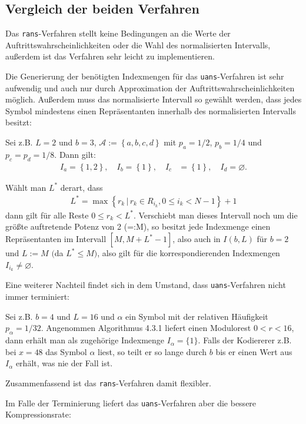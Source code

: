 \documentclass[a4paper,12pt]{article}
\newcommand{\A}{\mathcal A}
\newcounter{Algorithmus}
\begin{document}
\subsection{Vergleich der beiden Verfahren}\label{vglBeiderVerfahren}
Das {\tt{rans}}-Verfahren stellt keine Bedingungen an die Werte der Auftrittswahrscheinlichkeiten oder die Wahl des normalisierten Intervalls, außerdem ist das Verfahren sehr leicht zu implementieren.
\par
Die Generierung der benötigten Indexmengen für das {\tt{uans}}-Verfahren ist sehr aufwendig und auch nur durch Approximation der Auftrittswahrscheinlichkeiten möglich. Außerdem
muss das normalisierte Intervall so gewählt werden, dass jedes Symbol mindestens einen Repräsentanten innerhalb  des normalisierten Intervalls besitzt:
\par
Sei z.B. $L=2$ und $b=3$, $\A:=\left\{a, b, c, d\right\}$ mit $p_{a}=1/2$, $p_{b}=1/4$ und $p_{c}=p_{d}=1/8$. 
Dann gilt:
\begin{align*}
I_{a}=\left\{1,2\right\},\quad  I_{b}=\left\{1\right\},\quad I_{c}&=\left\{1\right\},\quad I_{d}=\varnothing.
\end{align*}
\par
Wählt man $L^{*}$ derart, dass 
\begin{align*}
L^{*} = \max \left\{r_{k}\,|\,r_{k}\in R_{i_{k}}, 0\leq i_{k} < N-1\right\} +1
\end{align*} 
dann gilt für alle Reste $0 \leq r_{k} < L^{*}$. Verschiebt man dieses Intervall noch um die größte auftretende Potenz von 2 (=:M), so besitzt jede Indexmenge einen Repräsentanten im Intervall $[M,M + L^{*}-1]$, also auch in $I(b,L)$ für $b=2$ und $L:=M$ $($da $L^{*} \leq M)$, also gilt für die korrespondierenden Indexmengen $I_{i_{k}} \neq \varnothing$.
\par
Eine weiterer Nachteil findet sich in dem Umstand, dass {\tt{uans}}-Verfahren nicht immer terminiert:
\par
Sei z.B. $b=4$ und $L=16$ und $\alpha$ ein Symbol mit der relativen Häufigkeit $p_{\alpha}=1/32$. Angenommen Algorithmus 4.3.1 liefert einen Modulorest $0 < r < 16$, dann erhält man als zugehörige Indexmenge $I_{\alpha}=\{1\}$. Falls der Kodiererer z.B. bei  $x=48$ das Symbol $\alpha$ liest, so teilt er so lange durch $b$ bis er einen Wert aus $I_{\alpha}$ erhält, was nie der Fall ist.
\par
Zusammenfassend ist das {\tt{rans}}-Verfahren damit flexibler. 
\par
Im Falle der Terminierung liefert das {\tt{uans}}-Verfahren  aber die bessere Kompressionsrate:
\end{document}
